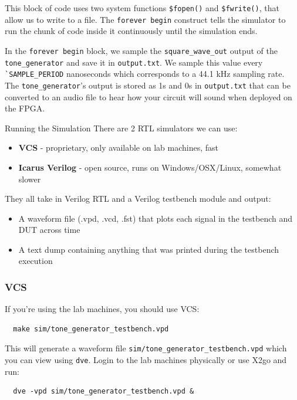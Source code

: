 \documentclass[11pt]{article}
\makeatletter
\renewcommand{\subsection}
{\@startsection {subsection}{1}{0pt}
 {-1ex}
 {0.5ex}
 {\bfseries\normalsize}}
\makeatother
\begin{document}
This block of code uses two system functions \verb|$fopen()| and \verb|$fwrite()|, that allow us to write to a file.
The \verb|forever begin| construct tells the simulator to run the chunk of code inside it continuously until the simulation ends.

In the \verb|forever begin| block, we sample the \verb|square_wave_out| output of the \verb|tone_generator| and save it in \verb|output.txt|.
We sample this value every \verb|`SAMPLE_PERIOD| nanoseconds which corresponds to a 44.1 kHz sampling rate.
The \verb|tone_generator|'s output is stored as 1s and 0s in \verb|output.txt| that can be converted to an audio file to hear how your circuit will sound when deployed on the FPGA.

\subsection{Running the Simulation}
There are 2 RTL simulators we can use:
\begin{itemize}
  \item \textbf{VCS} - proprietary, only available on lab machines, fast
  \item \textbf{Icarus Verilog} - open source, runs on Windows/OSX/Linux, somewhat slower
\end{itemize}
They all take in Verilog RTL and a Verilog testbench module and output:
\begin{itemize}
  \item A waveform file (.vpd, .vcd, .fst) that plots each signal in the testbench and DUT across time
  \item A text dump containing anything that was printed during the testbench execution
\end{itemize}

\subsubsection{VCS}
If you're using the lab machines, you should use VCS:
\begin{verbatim}
  make sim/tone_generator_testbench.vpd
\end{verbatim}
This will generate a waveform file \verb|sim/tone_generator_testbench.vpd| which you can view using \verb|dve|.
Login to the lab machines physically or use X2go and run:
\begin{verbatim}
  dve -vpd sim/tone_generator_testbench.vpd &
\end{verbatim}
\end{document}
